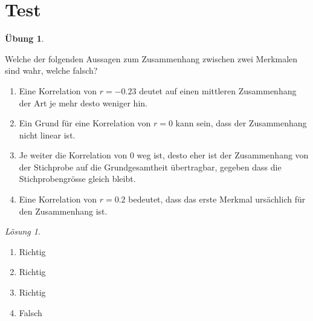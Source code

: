 \documentclass[
]{book}
\providecommand{\tightlist}{%
  \setlength{\itemsep}{0pt}\setlength{\parskip}{0pt}}
\theoremstyle{definition}
\theoremstyle{definition}
\theoremstyle{definition}
\newtheorem{exercise}{Übung}[chapter]
\theoremstyle{definition}
\theoremstyle{remark}
\newtheorem*{solution}{Lösung}
\begin{document}
\section{Test}\label{test-5}

\begin{exercise}
\protect\hypertarget{exr:test-theorie-korrelation}{}\label{exr:test-theorie-korrelation}

Welche der folgenden Aussagen zum Zusammenhang zwischen zwei Merkmalen sind wahr, welche falsch?

\begin{enumerate}
\def\labelenumi{\alph{enumi})}
\tightlist
\item
  Eine Korrelation von \(r = -0.23\) deutet auf einen mittleren Zusammenhang der Art je mehr desto weniger hin.
\item
  Ein Grund für eine Korrelation von \(r=0\) kann sein, dass der Zusammenhang nicht linear ist.
\item
  Je weiter die Korrelation von \(0\) weg ist, desto eher ist der Zusammenhang von der Stichprobe auf die Grundgesamtheit übertragbar, gegeben dass die Stichprobengrösse gleich bleibt.
\item
  Eine Korrelation von \(r = 0.2\) bedeutet, dass das erste Merkmal ursächlich für den Zusammenhang ist.
\end{enumerate}

\end{exercise}

\begin{solution}
\leavevmode

\begin{enumerate}
\def\labelenumi{\alph{enumi})}
\tightlist
\item
  Richtig
\item
  Richtig
\item
  Richtig
\item
  Falsch
\end{enumerate}

\end{solution}
\end{document}
